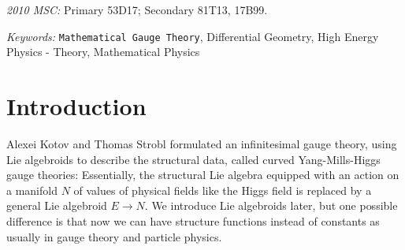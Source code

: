 \documentclass[a4paper,oneside,11pt,leqno]{scrartcl} %
\theoremstyle{plain}
\theoremstyle{remark}
\theoremstyle{definition}
\begin{document}
\begin{titlepage}
\begin{center}
\begin{abstract}
{	%
}
 \end{abstract}
\end{center}

\textit{2010 MSC:} Primary 53D17; Secondary 81T13, 17B99.

\textit{Keywords:} \texttt{Mathematical Gauge Theory}, Differential Geometry, High Energy Physics - Theory, Mathematical Physics

\end{titlepage}




\tableofcontents





\renewcommand{\thefootnote}{\arabic{footnote}}
%
\setlength{\parindent}{12 pt}




\section{Introduction}

Alexei Kotov and Thomas Strobl formulated an infinitesimal gauge theory, using Lie algebroids to describe the structural data, called curved Yang-Mills-Higgs gauge theories: Essentially, the structural Lie algebra equipped with an action on a manifold $N$ of values of physical fields like the Higgs field is replaced by a general Lie algebroid $E \to N$. We introduce Lie algebroids later, but one possible difference is that now we can have structure functions instead of constants as usually in gauge theory and particle physics.
\end{document}
